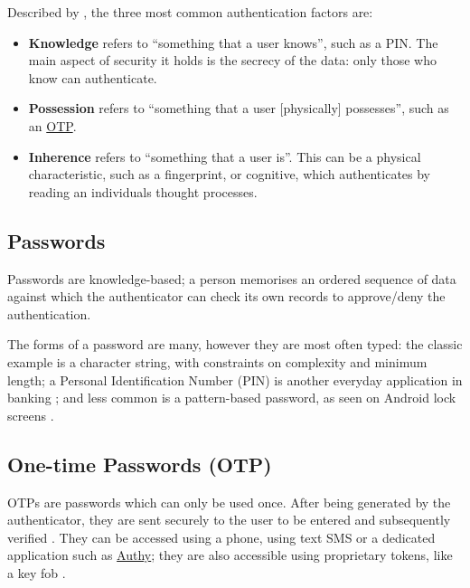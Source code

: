 Described by \cite{surveyOnAuthenticationFactors}, the
three most common authentication factors are:

\begin{itemize} 

  \item \textbf{Knowledge} \label{p:knowledge} refers to
        \enquote{something that a user knows}, such as a PIN.
        The main aspect of security it holds is the secrecy of the
        data: only those who know can authenticate.

  \item \textbf{Possession} refers to \enquote{something
          that a user [physically] possesses}, such as an
        \hyperref[p:otp]{OTP}.

  \item \textbf{Inherence} refers to \enquote{something
          that a user is}.
        This can be a physical characteristic, such as a
        fingerprint, or cognitive, which authenticates by reading
        an individuals thought processes.
\end{itemize}


\subsection{Passwords}
\label{p:passwords}
Passwords are knowledge-based; a person memorises an
ordered sequence of data against which the authenticator
can check its own records to approve/deny the
authentication.

The forms of a password are many, however they are most
often typed: the classic example is a character string,
with  constraints on complexity and minimum length; a
Personal Identification Number (PIN) is another everyday
application in banking \parencite{whatIsAuthentiction}; and
less common is a pattern-based password, as seen on Android
lock screens \parencite{androidLockScreen}.

\subsection{One-time Passwords (OTP)}
\label{p:otp}
OTPs are passwords which can only be used once.
After being generated by the authenticator, they are sent
securely to the user to be entered and subsequently
verified \parencite{surveyOnAuthenticationFactors}.
They can be accessed using a phone, using text SMS or a
dedicated application such as
\href{https://www.twilio.com/authy/features/totp}{Authy};
they are also accessible using proprietary tokens, like a
key fob \parencite{whatIsOtp}.

